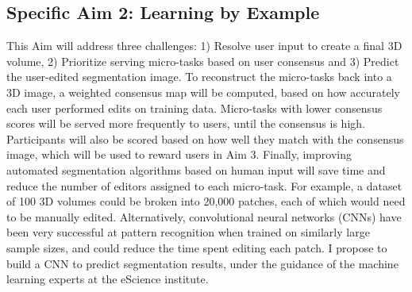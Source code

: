 
\subsection*{Specific Aim 2: Learning by Example}
This Aim will address three challenges: 1) Resolve user input to create a final 3D volume, 2) Prioritize serving micro-tasks based on user consensus and 3) Predict the user-edited segmentation image. To reconstruct the micro-tasks back into a 3D image, a weighted consensus map will be computed, based on how accurately each user performed edits on training data. Micro-tasks with lower consensus scores will be served more frequently to users, until the consensus is high. Participants will also be scored based on how well they match with the consensus image, which will be used to reward users in Aim 3. Finally, improving automated segmentation algorithms based on human input will save time and reduce the number of editors assigned to each micro-task. For example, a dataset of 100 3D volumes could be broken into 20,000 patches, each of which would need to be manually edited. Alternatively, convolutional neural networks (CNNs) have been very successful at pattern recognition when trained on similarly large sample sizes, and could reduce the time spent editing each patch. I propose to build a CNN to predict segmentation results, under the guidance of the machine learning experts at the eScience institute. 

